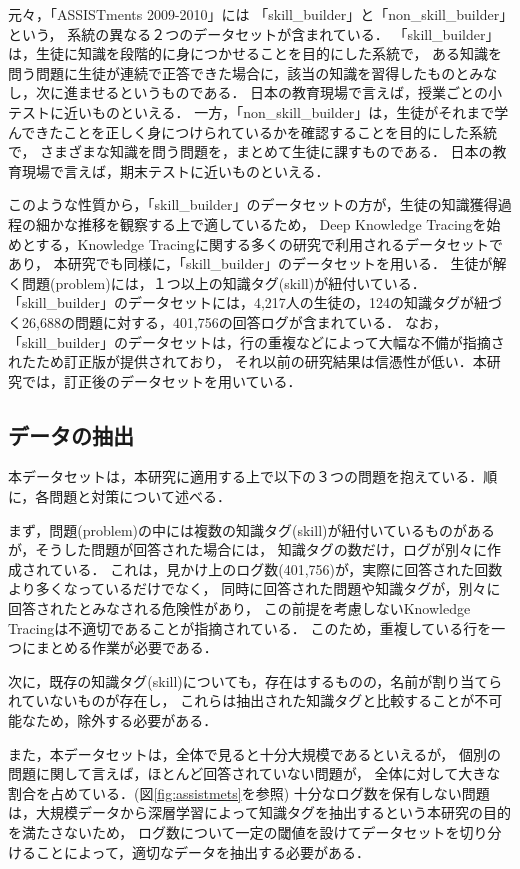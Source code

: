 元々，「ASSISTments 2009-2010」には
「skill\_builder」と「non\_skill\_builder」という，
系統の異なる２つのデータセットが含まれている．
「skill\_builder」は，生徒に知識を段階的に身につかせることを目的にした系統で，
ある知識を問う問題に生徒が連続で正答できた場合に，該当の知識を習得したものとみなし，次に進ませるというものである．
日本の教育現場で言えば，授業ごとの小テストに近いものといえる．
一方，「non\_skill\_builder」は，生徒がそれまで学んできたことを正しく身につけられているかを確認することを目的にした系統で，
さまざまな知識を問う問題を，まとめて生徒に課すものである．
日本の教育現場で言えば，期末テストに近いものといえる．

このような性質から，「skill\_builder」のデータセットの方が，生徒の知識獲得過程の細かな推移を観察する上で適しているため，
Deep Knowledge Tracing\cite{piech2015deep}を始めとする，Knowledge Tracingに関する多くの研究で利用されるデータセットであり，
本研究でも同様に，「skill\_builder」のデータセットを用いる．
生徒が解く問題(problem)には，１つ以上の知識タグ(skill)が紐付いている．
「skill\_builder」のデータセットには，4,217人の生徒の，124の知識タグが紐づく26,688の問題に対する，401,756の回答ログが含まれている．
なお，「skill\_builder」のデータセットは，行の重複などによって大幅な不備が指摘されたため訂正版が提供されており，
それ以前の研究結果は信憑性が低い．本研究では，訂正後のデータセットを用いている．


\subsection{データの抽出}
本データセットは，本研究に適用する上で以下の３つの問題を抱えている．順に，各問題と対策について述べる．

まず，問題(problem)の中には複数の知識タグ(skill)が紐付いているものがあるが，そうした問題が回答された場合には，
知識タグの数だけ，ログが別々に作成されている．
これは，見かけ上のログ数(401,756)が，実際に回答された回数より多くなっているだけでなく，
同時に回答された問題や知識タグが，別々に回答されたとみなされる危険性があり，
この前提を考慮しないKnowledge Tracingは不適切であることが指摘されている\cite{xiong2016going}．
このため，重複している行を一つにまとめる作業が必要である．

次に，既存の知識タグ(skill)についても，存在はするものの，名前が割り当てられていないものが存在し，
これらは抽出された知識タグと比較することが不可能なため，除外する必要がある．


また，本データセットは，全体で見ると十分大規模であるといえるが，
個別の問題に関して言えば，ほとんど回答されていない問題が，
全体に対して大きな割合を占めている．(図\ref{fig:assistmets}を参照)
十分なログ数を保有しない問題は，大規模データから深層学習によって知識タグを抽出するという本研究の目的を満たさないため，
ログ数について一定の閾値を設けてデータセットを切り分けることによって，適切なデータを抽出する必要がある．


